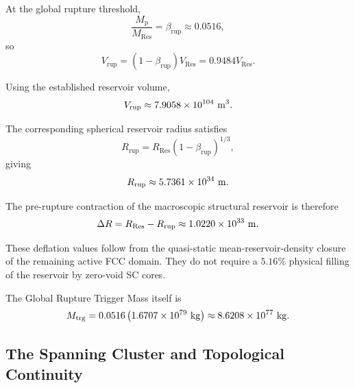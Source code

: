 At the global rupture threshold,
\begin{equation}
    \frac{
        M_{\mathrm p}
    }{
        M_{\mathrm{Res}}
    }
    =
    \beta_{\mathrm{rup}}
    \approx
    0.0516,
\end{equation}
so
\begin{equation}
    V_{\mathrm{rup}}
    =
    (1-\beta_{\mathrm{rup}})
    V_{\mathrm{Res}}
    =
    0.9484
    V_{\mathrm{Res}}.
\end{equation}

Using the established reservoir volume,
\begin{equation}
    V_{\mathrm{rup}}
    \approx
    7.9058\times10^{104}
    \ {\rm m^3}.
\end{equation}

The corresponding spherical reservoir radius satisfies
\begin{equation}
    R_{\mathrm{rup}}
    =
    R_{\mathrm{Res}}
    (1-\beta_{\mathrm{rup}})^{1/3},
\end{equation}
giving
\begin{equation}
    R_{\mathrm{rup}}
    \approx
    5.7361\times10^{34}
    \ {\rm m}.
\end{equation}

The pre-rupture contraction of the macroscopic structural reservoir is
therefore
\begin{equation}
    \Delta R
    =
    R_{\mathrm{Res}}
    -
    R_{\mathrm{rup}}
    \approx
    1.0220\times10^{33}
    \ {\rm m}.
\end{equation}

These deflation values follow from the quasi-static mean-reservoir-density
closure of the remaining active FCC domain. They do not require a
\(5.16\%\) physical filling of the reservoir by zero-void SC cores.

The Global Rupture Trigger Mass itself is
\begin{equation}
    M_{\mathrm{trg}}
    =
    0.0516
    \left(
        1.6707\times10^{79}
        \ {\rm kg}
    \right)
    \approx
    8.6208\times10^{77}
    \ {\rm kg}.
\end{equation}


\subsection{The Spanning Cluster and Topological Continuity}

